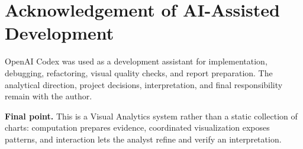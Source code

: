 \documentclass[9pt,a4paper]{article}
\begin{document}
\section*{Acknowledgement of AI-Assisted Development}
OpenAI Codex was used as a development assistant for implementation, debugging, refactoring, visual quality checks, and report preparation. The analytical direction, project decisions, interpretation, and final responsibility remain with the author.

\begin{conceptbox}
\small\textbf{Final point.}
This is a Visual Analytics system rather than a static collection of charts: computation prepares evidence, coordinated visualization exposes patterns, and interaction lets the analyst refine and verify an interpretation.
\end{conceptbox}
\end{document}
